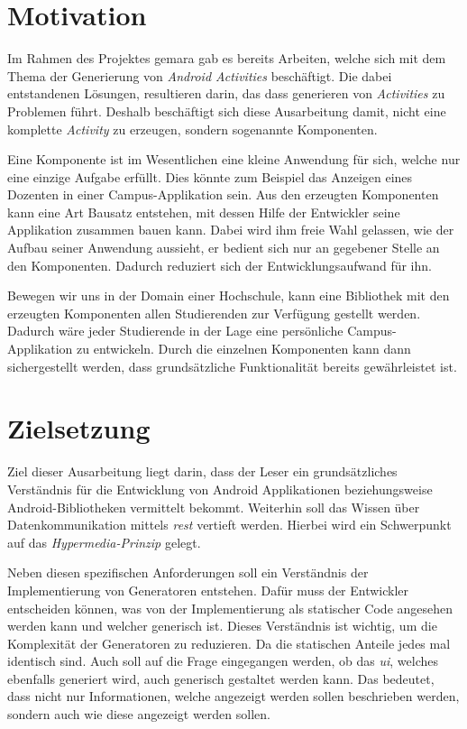 \section{Motivation}\label{sec:motivation}
Im Rahmen des Projektes \ac{gemara} gab es bereits Arbeiten, welche sich mit dem Thema der Generierung von \textit{Android Activities} beschäftigt. Die dabei entstandenen Lösungen, resultieren darin, das dass generieren von \textit{Activities} zu Problemen führt. Deshalb beschäftigt sich diese Ausarbeitung damit, nicht eine komplette \textit{Activity} zu erzeugen, sondern sogenannte Komponenten.

Eine Komponente ist im Wesentlichen eine kleine Anwendung für sich, welche nur eine einzige Aufgabe erfüllt. Dies könnte zum Beispiel das Anzeigen eines Dozenten in einer Campus-Applikation sein.
Aus den erzeugten Komponenten kann eine Art Bausatz entstehen, mit dessen Hilfe der Entwickler seine Applikation zusammen bauen kann. Dabei wird ihm freie Wahl gelassen, wie der Aufbau seiner Anwendung aussieht, er bedient sich nur an gegebener Stelle an den Komponenten. Dadurch reduziert sich der Entwicklungsaufwand für ihn.

Bewegen wir uns in der Domain einer Hochschule, kann eine Bibliothek mit den erzeugten Komponenten allen Studierenden zur Verfügung gestellt werden. Dadurch wäre jeder Studierende in der Lage eine persönliche Campus-Applikation zu entwickeln. Durch die einzelnen Komponenten kann dann sichergestellt werden, dass grundsätzliche Funktionalität bereits gewährleistet ist.

\section{Zielsetzung}\label{sec:target}
Ziel dieser Ausarbeitung liegt darin, dass der Leser ein grundsätzliches Verständnis für die Entwicklung von Android Applikationen beziehungsweise Android-Bibliotheken vermittelt bekommt. Weiterhin soll das Wissen über Datenkommunikation mittels \textit{\acf{rest}} vertieft werden. Hierbei wird ein Schwerpunkt auf das \textit{Hypermedia-Prinzip} gelegt. 

Neben diesen spezifischen Anforderungen soll ein Verständnis der Implementierung von Generatoren entstehen. Dafür muss der Entwickler entscheiden können, was von der Implementierung als statischer Code angesehen werden kann und welcher generisch ist. Dieses Verständnis ist wichtig, um die Komplexität der Generatoren zu reduzieren. Da die statischen Anteile jedes mal identisch sind.
Auch soll auf die Frage eingegangen werden, ob das \textit{\ac{ui}}, welches ebenfalls generiert wird, auch generisch gestaltet werden kann. Das bedeutet, dass nicht nur Informationen, welche angezeigt werden sollen beschrieben werden, sondern auch wie diese angezeigt werden sollen.

